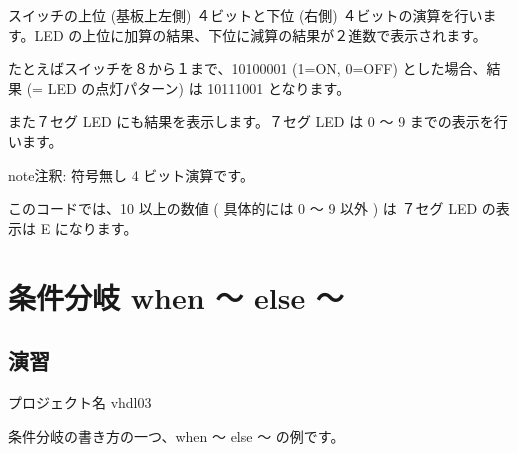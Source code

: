 \documentclass[letterpaper,10pt,dvipdfmx]{sphinxmanual}
\begin{document}
スイッチの上位 (基板上左側) ４ビットと下位 (右側) ４ビットの演算を行います。LED の上位に加算の結果、下位に減算の結果が２進数で表示されます。

たとえばスイッチを８から１まで、10100001  (1=ON, 0=OFF) とした場合、結果 (= LED の点灯パターン) は 10111001 となります。

また７セグ LED にも結果を表示します。７セグ LED は 0 ～ 9 までの表示を行います。

\begin{figure}[htbp]
\centering

\noindent{}
\end{figure}

\begin{sphinxadmonition}{note}{注釈:}
符号無し 4 ビット演算です。

このコードでは、10 以上の数値 ( 具体的には 0 ～ 9 以外 ) は ７セグ LED の表示は E になります。
\end{sphinxadmonition}


\section{条件分岐 when ～ else ～}
\label{\detokenize{05_try:when-else}}

\subsection{演習}
\label{\detokenize{05_try:id7}}
プロジェクト名 vhdl03

条件分岐の書き方の一つ、when ～ else ～ の例です。

\begin{sphinxVerbatim}[commandchars=\\\{\}]
 
 
 
 

  
        
        
        
       
 

    
        
      
 
\end{sphinxVerbatim}
\end{document}
